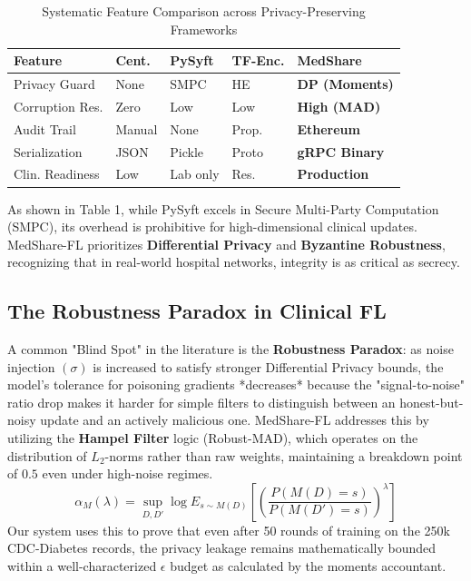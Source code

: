 \documentclass[10pt, a4paper, twocolumn]{article}
\begin{document}
\begin{table}[hbt!]
\centering
\scriptsize
\begin{tabular}{l>{\raggedright\arraybackslash}p{0.9cm}>{\raggedright\arraybackslash}p{0.9cm}>{\raggedright\arraybackslash}p{0.9cm}>{\raggedright\arraybackslash}p{1.3cm}}
\toprule
\textbf{Feature} & \textbf{Cent.} & \textbf{PySyft} & \textbf{TF-Enc.} & \textbf{MedShare} \\
\midrule
Privacy Guard & None & SMPC & HE & \textbf{DP (Moments)} \\
Corruption Res. & Zero & Low & Low & \textbf{High (MAD)} \\
Audit Trail & Manual & None & Prop. & \textbf{Ethereum} \\
Serialization & JSON & Pickle & Proto & \textbf{gRPC Binary} \\
Clin. Readiness & Low & Lab only & Res. & \textbf{Production} \\
\bottomrule
\end{tabular}
\caption{Systematic Feature Comparison across Privacy-Preserving Frameworks}
\end{table}

As shown in Table 1, while PySyft excels in Secure Multi-Party Computation (SMPC), its overhead is prohibitive for high-dimensional clinical updates. MedShare-FL prioritizes \textbf{Differential Privacy} and \textbf{Byzantine Robustness}, recognizing that in real-world hospital networks, integrity is as critical as secrecy.

\subsection{The Robustness Paradox in Clinical FL}
A common "Blind Spot" in the literature is the \textbf{Robustness Paradox}: as noise injection $(\sigma)$ is increased to satisfy stronger Differential Privacy bounds, the model's tolerance for poisoning gradients *decreases* because the "signal-to-noise" ratio drop makes it harder for simple filters to distinguish between an honest-but-noisy update and an actively malicious one. MedShare-FL addresses this by utilizing the \textbf{Hampel Filter} logic (Robust-MAD), which operates on the distribution of $L_2$-norms rather than raw weights, maintaining a breakdown point of $0.5$ even under high-noise regimes.
\begin{equation}
    \alpha_M(\lambda) = \sup_{D, D'} \log E_{s \sim M(D)} [ (\frac{P(M(D)=s)}{P(M(D')=s)})^{\lambda} ]
\end{equation}
Our system uses this to prove that even after 50 rounds of training on the 250k CDC-Diabetes records, the privacy leakage remains mathematically bounded within a well-characterized $\epsilon$ budget as calculated by the moments accountant.
\end{document}

